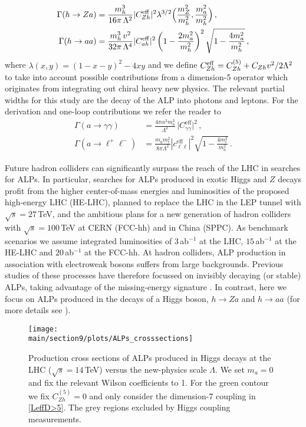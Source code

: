 \begin{align}
\Gamma(h \to Za)&=\frac{m_h^3}{16\pi\,\Lambda^2}|C_{Zh}^\text{eff}|^2\lambda^{3/2}\Big(\frac{m_Z^2}{m_h^2},\frac{m_a^2}{m_h^2}\Big)\,,\\
\Gamma(h \to aa)&=\frac{m_h^3\,v^2}{32\pi\,\Lambda^4}|C_{ah}^{\rm eff}|^2\left(1-\frac{2m_a^2}{m_h^2}\right)^2\sqrt{1-\frac{4m_a^2}{m_h^2}}\,,
\end{align}
%
where $\lambda(x,y)=(1-x-y)^2-4xy$ and we define $C_{Zh}^{\rm eff} = C_{Zh}^{(5)} + C_{Zh} v^2/2 \Lambda^2$ to take into account possible contributions from a dimension-5 operator which originates from integrating out chiral heavy new physics. The relevant partial widths for this study are the decay of the ALP into photons and leptons. For the derivation and one-loop contributions we refer the reader to \cite{Bauer:2017ris}
%
\begin{align}
 \Gamma(a\to\gamma\gamma)  &= \frac{4\pi\alpha^2 m_a^3}{\Lambda^2}\,\big| C_{\gamma\gamma}^\text{eff} \big|^2 \,, \\
 \Gamma(a\to \ell^+ \ell^-)&=\frac{m_a m_\ell^2}{8\pi\Lambda^2} \left| c_{\ell\ell}^\text{eff}\right|^2 \sqrt{1-\frac{4m_\ell^2}{m_a^2}}\,.
\end{align}
%


Future hadron colliders can significantly surpass the reach of the LHC in searches for ALPs. In particular, searches for ALPs produced in exotic Higgs and $Z$ decays profit from the higher center-of-mass energies and luminosities of the proposed high-energy LHC (HE-LHC), planned to replace the LHC in the LEP tunnel with $\sqrt{s}=27 \,$TeV, and the ambitious plans for a new generation of hadron colliders with $\sqrt{s}=100\,$TeV at CERN (FCC-hh) and in China (SPPC). As benchmark scenarios we assume integrated luminosities of $3$\,ab$^{-1}$ at the LHC, $15$\,ab$^{-1}$ at the HE-LHC and $20$\,ab$^{-1}$ at the FCC-hh.
At hadron colliders, ALP production in association with electroweak bosons suffers from large backgrounds. Previous studies of these processes have therefore focussed on invisibly decaying (or stable) ALPs, taking advantage of the missing-energy signature \cite{Mimasu:2014nea,Brivio:2017ije}. In contrast, here we focus on ALPs produced in the decays of a Higgs boson, $h\to Za$ and $h \to a a$ (for more details see \cite{Bauer:2018uxu}).


%
\begin{figure}
\begin{center}
    \texttt{[image: \\main/section9/plots/ALPs\_crosssections]}
\caption{\label{fig:ALPpsec} Production cross sections of ALPs produced in Higgs decays at the LHC ($\sqrt{s} = 14\,$TeV) versus the new-physics scale $\Lambda$. We set $m_a=0$ and fix the relevant Wilson coefficients to 1. For the green contour we fix $C_{Zh}^{(5)}=0$ and only consider the dimension-7 coupling in \eqref{LeffD>5}.
The grey regions excluded by Higgs coupling measurements. }
\end{center}
\end{figure}
%

